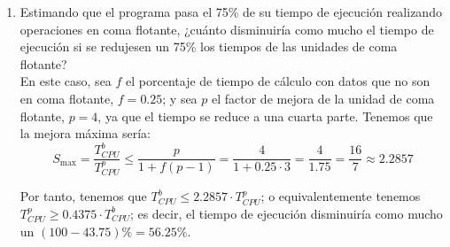 \begin{ejercicio}
\begin{enumerate}
        \item Estimando que el programa pasa el 75\% de su tiempo de ejecución realizando operaciones en coma
        flotante, ¿cuánto disminuiría como mucho el tiempo de ejecución si se redujesen un 75\% los tiempos de las
        unidades de coma flotante?\\

        En este caso, sea $f$ el porcentaje de tiempo de cálculo con datos que no son en coma flotante, $f=0.25$;
        y sea $p$ el factor de mejora de la unidad de coma flotante, $p=4$, ya que el tiempo se reduce a una cuarta parte. Tenemos que la mejora máxima sería:
        \begin{equation*}
            S_{\max} = \frac{T_{CPU}^b}{T_{CPU}^p} \leq \frac{p}{1+f(p-1)} = \frac{4}{1+0.25\cdot 3} = \frac{4}{1.75} = \frac{16}{7} \approx 2.2857
        \end{equation*}

        Por tanto, tenemos que $T_{CPU}^b \leq 2.2857 \cdot T_{CPU}^p$; o equivalentemente tenemos $T_{CPU}^p \geq 0.4375 \cdot T_{CPU}^b$;
        es decir, el tiempo de ejecución disminuiría como mucho un $(100-43.75)\% = 56.25\%$.
    \end{enumerate}
\end{ejercicio}


